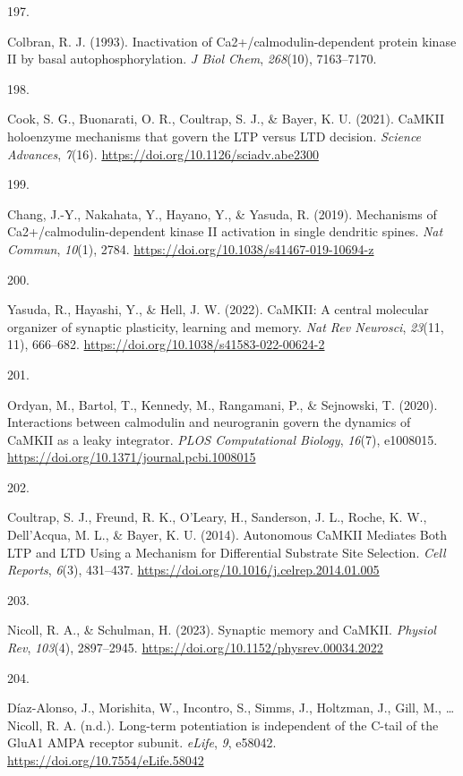 \documentclass[
  11pt,
  letterpaper,
]{scrreprt}
\newlength{\cslhangindent}
\newlength{\csllabelwidth}
\newenvironment{CSLReferences}[2] %
 {\begin{list}{}{%
  \setlength{\itemindent}{0pt}
  \setlength{\leftmargin}{0pt}
  \setlength{\parsep}{0pt}
  \ifodd #1
   \setlength{\leftmargin}{\cslhangindent}
   \setlength{\itemindent}{-1\cslhangindent}
  \fi
  \setlength{\itemsep}{#2\baselineskip}}}
 {\end{list}}
\newcommand{\CSLLeftMargin}[1]{\parbox[t]{\csllabelwidth}{\strut#1\strut}}
\newcommand{\CSLRightInline}[1]{\parbox[t]{\linewidth - \csllabelwidth}{\strut#1\strut}}
\begin{document}
\begin{CSLReferences}{0}{0}
\CSLLeftMargin{197. }%
\CSLRightInline{Colbran, R. J. (1993). Inactivation of
{Ca2}+/calmodulin-dependent protein kinase {II} by basal
autophosphorylation. \emph{J Biol Chem}, \emph{268}(10), 7163--7170.}

\CSLLeftMargin{198. }%
\CSLRightInline{Cook, S. G., Buonarati, O. R., Coultrap, S. J., \&
Bayer, K. U. (2021). {CaMKII} holoenzyme mechanisms that govern the
{LTP} versus {LTD} decision. \emph{Science Advances}, \emph{7}(16).
\url{https://doi.org/10.1126/sciadv.abe2300}}

\CSLLeftMargin{199. }%
\CSLRightInline{Chang, J.-Y., Nakahata, Y., Hayano, Y., \& Yasuda, R.
(2019). Mechanisms of {Ca2}+/calmodulin-dependent kinase {II} activation
in single dendritic spines. \emph{Nat Commun}, \emph{10}(1), 2784.
\url{https://doi.org/10.1038/s41467-019-10694-z}}

\CSLLeftMargin{200. }%
\CSLRightInline{Yasuda, R., Hayashi, Y., \& Hell, J. W. (2022).
{CaMKII}: A central molecular organizer of synaptic plasticity, learning
and memory. \emph{Nat Rev Neurosci}, \emph{23}(11, 11), 666--682.
\url{https://doi.org/10.1038/s41583-022-00624-2}}

\CSLLeftMargin{201. }%
\CSLRightInline{Ordyan, M., Bartol, T., Kennedy, M., Rangamani, P., \&
Sejnowski, T. (2020). Interactions between calmodulin and neurogranin
govern the dynamics of {CaMKII} as a leaky integrator. \emph{PLOS
Computational Biology}, \emph{16}(7), e1008015.
\url{https://doi.org/10.1371/journal.pcbi.1008015}}

\CSLLeftMargin{202. }%
\CSLRightInline{Coultrap, S. J., Freund, R. K., O'Leary, H., Sanderson,
J. L., Roche, K. W., Dell'Acqua, M. L., \& Bayer, K. U. (2014).
Autonomous {CaMKII Mediates Both LTP} and {LTD Using} a {Mechanism} for
{Differential Substrate Site Selection}. \emph{Cell Reports},
\emph{6}(3), 431--437.
\url{https://doi.org/10.1016/j.celrep.2014.01.005}}

\CSLLeftMargin{203. }%
\CSLRightInline{Nicoll, R. A., \& Schulman, H. (2023). Synaptic memory
and {CaMKII}. \emph{Physiol Rev}, \emph{103}(4), 2897--2945.
\url{https://doi.org/10.1152/physrev.00034.2022}}

\CSLLeftMargin{204. }%
\CSLRightInline{Díaz-Alonso, J., Morishita, W., Incontro, S., Simms, J.,
Holtzman, J., Gill, M., \ldots{} Nicoll, R. A. (n.d.). Long-term
potentiation is independent of the {C-tail} of the {GluA1 AMPA} receptor
subunit. \emph{eLife}, \emph{9}, e58042.
\url{https://doi.org/10.7554/eLife.58042}}


\end{CSLReferences}
\end{document}
